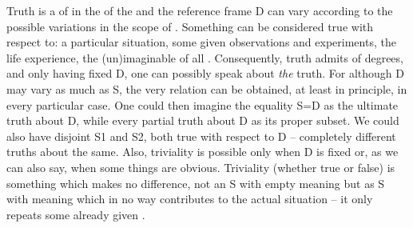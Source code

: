 \pa Truth is a  of  in the  of the
 and the reference frame D can vary according to the possible
variations in the scope of . Something can be considered true
with respect to: a particular situation, some given observations and
experiments, the life experience, the (un)imaginable  of all
.  Consequently, truth admits of degrees, and only having fixed
D, one can possibly speak about {\em the} truth.
For although D may vary as much as S, the very relation  can be
obtained, at least in principle, in every particular case. 
One could 
then imagine the equality S=D as the ultimate truth about D, while every partial
truth about D as its proper subset. We could also have disjoint S1
and S2, both true with respect to D -- completely different truths about the same.
Also, triviality is possible only when D is fixed or, as we can also say, when
some things are obvious. 
Triviality (whether true or false) is
something which makes no difference, not an S with empty meaning
but as S with meaning which in no way
contributes to the actual situation -- it only repeats some already given . 


